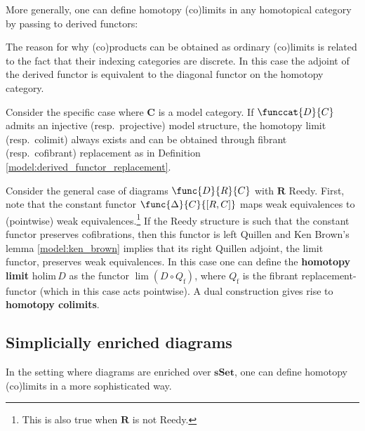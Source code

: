     More generally, one can define homotopy (co)limits in any homotopical category by passing to derived functors:
    \begin{remark}
        The reason for why (co)products can be obtained as ordinary (co)limits  is related to the fact that their indexing categories are discrete. In this case the adjoint of the derived functor is equivalent to the diagonal functor on the homotopy category.
    \end{remark}

    \begin{property}
        Consider the specific case where $\mathbf{C}$ is a model category. If $\funccat{D}{C}$ admits an injective (resp.~projective) model structure, the homotopy limit (resp.~colimit) always exists and can be obtained through fibrant (resp.~cofibrant) replacement as in Definition \ref{model:derived_functor_replacement}.
    \end{property}
    \begin{example}
        Consider the general case of diagrams $\func{D}{R}{C}$ with $\mathbf{R}$ Reedy. First, note that the constant functor $\func{\Delta}{C}{[R,C]}$ maps weak equivalences to (pointwise) weak equivalences.\footnote{This is also true when $\mathbf{R}$ is not Reedy.} If the Reedy structure is such that the constant functor preserves cofibrations, then this functor is left Quillen and Ken Brown's lemma \ref{model:ken_brown} implies that its right Quillen adjoint, the limit functor, preserves weak equivalences. In this case one can define the \textbf{homotopy limit} $\mathrm{holim}\,D$ as the functor $\lim(D\circ Q_\mathrm{f})$, where $Q_\mathrm{f}$ is the fibrant replacement-functor (which in this case acts pointwise). A dual construction gives rise to \textbf{homotopy colimits}.
    \end{example}

\subsection{Simplicially enriched diagrams}

    In the setting where diagrams are enriched over $\mathbf{sSet}$, one can define homotopy (co)limits in a more sophisticated way.

